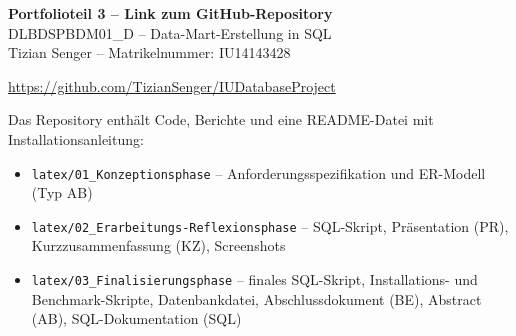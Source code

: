 \documentclass[11pt,a4paper]{article}
\begin{document}
\begin{center}
{\Large\textbf{Portfolioteil 3 -- Link zum GitHub-Repository}}\\[4pt]
DLBDSPBDM01\_D -- Data-Mart-Erstellung in SQL\\[2pt]
Tizian Senger -- Matrikelnummer: IU14143428
\end{center}

\vspace{1cm}
\begin{center}
{\large\url{https://github.com/TizianSenger/IUDatabaseProject}}
\end{center}
\vspace{1cm}

Das Repository enthält Code, Berichte und eine README-Datei mit Installationsanleitung:
\begin{itemize}
  \item \texttt{latex/01\_Konzeptionsphase} -- Anforderungsspezifikation und ER-Modell (Typ AB)
  \item \texttt{latex/02\_Erarbeitungs-Reflexionsphase} -- SQL-Skript, Präsentation (PR), Kurzzusammenfassung (KZ), Screenshots
  \item \texttt{latex/03\_Finalisierungsphase} -- finales SQL-Skript, Installations- und Benchmark-Skripte, Datenbankdatei, Abschlussdokument (BE), Abstract (AB), SQL-Dokumentation (SQL)
\end{itemize}
\end{document}
